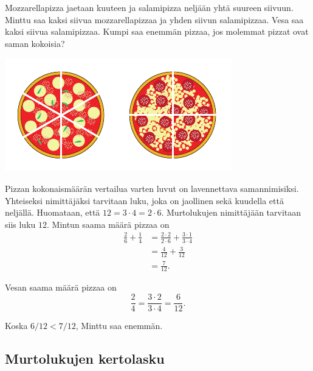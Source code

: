  \begin{esimerkki}
        Mozzarellapizza jaetaan kuuteen ja salamipizza neljään yhtä suureen siivuun. Minttu saa kaksi siivua mozzarellapizzaa ja yhden siivun salamipizzaa. Vesa saa kaksi siivua salamipizzaa. Kumpi saa enemmän pizzaa, jos molemmat pizzat ovat saman kokoisia?
        \begin{center}        
          \includegraphics[scale=1.0]{pictures/Kuva3-1-6-pizzat.pdf}
        \end{center}

\begin{esimratk}
        Pizzan kokonaismäärän vertailua varten luvut on lavennettava samannimisiksi. Yhteiseksi nimittäjäksi tarvitaan luku, joka on jaollinen sekä kuudella että neljällä. Huomataan, että $12 = 3\cdot 4 = 2\cdot 6$. Murtolukujen nimittäjään tarvitaan siis luku $12$.
        Mintun saama määrä pizzaa on
        \begin{align*}
           \frac{2}{6} + \frac{1}{4} &= \frac{2\cdot 2}{2\cdot 6} + \frac{3\cdot 1}{3\cdot 4} \\ 
	       							 &= \frac{4}{12}+\frac{3}{12} \\ 
	       							 &= \frac{7}{12}.
        \end{align*}
        
        Vesan saama määrä pizzaa on
        \[
            \frac{2}{4} =
            \frac{3\cdot 2}{3\cdot 4} =
            \frac{6}{12}.
        \]
\end{esimratk}        
        \begin{esimvast}
        Koska $6/12 < 7/12$, Minttu saa enemmän.
        \end{esimvast}
    \end{esimerkki}

    
\subsection{Murtolukujen kertolasku}
    
